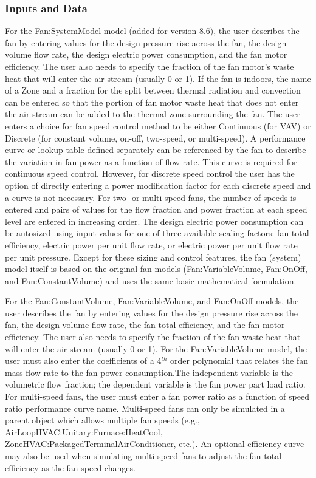 \subsubsection{Inputs and Data}\label{inputs-and-data-000}
For the Fan:SystemModel model (added for version 8.6), the user describes the fan by entering values for the design pressure rise across the fan, the design volume flow rate, the design electric power consumption, and the fan motor efficiency. The user also needs to specify the fraction of the fan motor's waste heat that will enter the air stream (usually 0 or 1). If the fan is indoors, the name of a Zone and a fraction for the split between thermal radiation and convection can be entered so that the portion of fan motor waste heat that does not enter the air stream can be added to the thermal zone surrounding the fan. The user enters a choice for fan speed control method to be either Continuous (for VAV) or Discrete (for constant volume, on-off, two-speed, or multi-speed).  A performance curve or lookup table defined separately can be referenced by the fan to describe the variation in fan power as a function of flow rate. This curve is required for continuous speed control. However, for discrete speed control the user has the option of directly entering a power modification factor for each discrete speed and a curve is not necessary. For two- or multi-speed fans, the number of speeds is entered and pairs of values for the flow fraction and power fraction at each speed level are entered in increasing order. The design electric power consumption can be autosized using input values for one of three available scaling factors: fan total efficiency, electric power per unit flow rate, or electric power per unit flow rate per unit pressure.  Except for these sizing and control features, the fan (system) model itself is based on the original fan models (Fan:VariableVolume, Fan:OnOff, and Fan:ConstantVolume) and uses the same basic mathematical formulation.

For the Fan:ConstantVolume, Fan:VariableVolume, and Fan:OnOff models, the user describes the fan by entering values for the design pressure rise across the fan, the design volume flow rate, the fan total efficiency, and the fan motor efficiency. The user also needs to specify the fraction of the fan waste heat that will enter the air stream (usually 0 or 1). For the Fan:VariableVolume model, the user must also enter the coefficients of a 4\(^{th}\) order polynomial that relates the fan mass flow rate to the fan power consumption.The independent variable is the volumetric flow fraction; the dependent variable is the fan power part load ratio. For multi-speed fans, the user must enter a fan power ratio as a function of speed ratio performance curve name. Multi-speed fans can only be simulated in a parent object which allows multiple fan speeds (e.g., AirLoopHVAC:Unitary:Furnace:HeatCool, ZoneHVAC:PackagedTerminalAirConditioner, etc.). An optional efficiency curve may also be used when simulating multi-speed fans to adjust the fan total efficiency as the fan speed changes.

